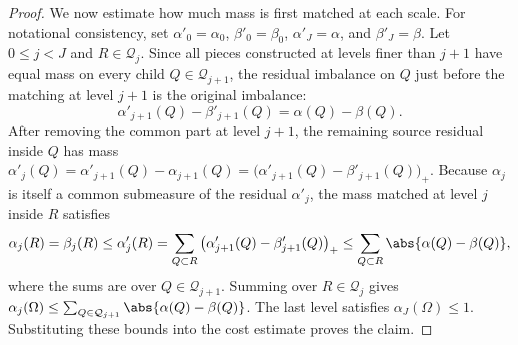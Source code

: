 \begin{proof}
	We now estimate how much mass is first matched at each scale. For notational consistency, set \(\alpha'_0=\alpha_0\), \(\beta'_0=\beta_0\), \(\alpha'_J=\alpha\), and \(\beta'_J=\beta\). Let \(0\leq j<J\) and \(R\in\mathcal Q_j\). Since all pieces constructed at levels finer than \(j+1\) have equal mass on every child \(Q\in\mathcal Q_{j+1}\), the residual imbalance on \(Q\) just before the matching at level \(j+1\) is the original imbalance:
	\[
		\alpha'_{j+1}(Q)-\beta'_{j+1}(Q)
		=
		\alpha(Q)-\beta(Q).
	\]
	After removing the common part at level \(j+1\), the remaining source residual inside \(Q\) has mass
	$\alpha'_j(Q) = \alpha'_{j+1}(Q)-\alpha_{j+1}(Q) = \big(\alpha'_{j+1}(Q)-\beta'_{j+1}(Q)\big)_+$.
	Because \(\alpha_j\) is itself a common submeasure of the residual \(\alpha'_j\), the mass matched at level \(j\) inside \(R\) satisfies
	\[
		\alpha_j(R)=\beta_j(R)
		\leq \alpha'_j(R)
		=
		\sum_{Q\subset R}
		\big(\alpha'_{j+1}(Q)-\beta'_{j+1}(Q)\big)_+
		\leq
		\sum_{Q\subset R}
		\abs{\alpha(Q)-\beta(Q)},
	\]
	where the sums are over \(Q\in\mathcal Q_{j+1}\). Summing over \(R\in\mathcal Q_j\) gives
	$\alpha_j(\Omega) \leq \sum_{Q\in\mathcal Q_{j+1}}\abs{\alpha(Q)-\beta(Q)}$.
	The last level satisfies \(\alpha_J(\Omega)\leq1\). Substituting these bounds into the cost estimate proves the claim.
\end{proof}


